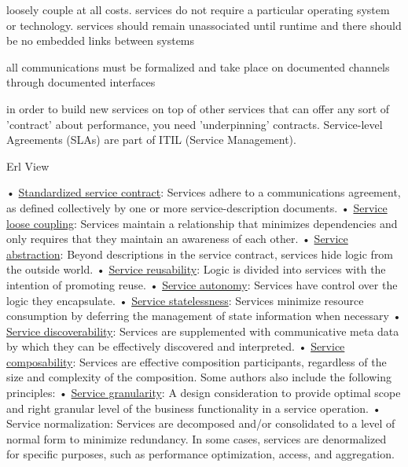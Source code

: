 \documentclass{article}
\begin{document}
loosely couple at all costs. services do not require a particular operating system or technology.  services should remain unassociated until runtime and there should be no embedded links between systems

all communications must be formalized and take place on documented channels through documented interfaces

in order to build new services on top of other services that can offer any sort of 'contract' about performance, you need 'underpinning' contracts.  Service-level Agreements (SLAs) are part of ITIL (Service Management).

Erl View

	•	
\href{http://en.wikipedia.org/wiki/Service-oriented\_architecture#Service\_contract}{Standardized service contract}: Services adhere to a communications agreement, as defined collectively by one or more service-description documents.
	•	
\href{http://en.wikipedia.org/wiki/Service\_loose\_coupling}{Service loose coupling}: Services maintain a relationship that minimizes dependencies and only requires that they maintain an awareness of each other.
	•	
\href{http://en.wikipedia.org/wiki/Service\_abstraction}{Service abstraction}: Beyond descriptions in the service contract, services hide logic from the outside world.
	•	
\href{http://en.wikipedia.org/wiki/Service\_Reusability\_Principle}{Service reusability}: Logic is divided into services with the intention of promoting reuse.
	•	
\href{http://en.wikipedia.org/wiki/Service\_Autonomy\_Principle}{Service autonomy}: Services have control over the logic they encapsulate.
	•	
\href{http://en.wikipedia.org/wiki/Service\_Statelessness\_Principle}{Service statelessness}: Services minimize resource consumption by deferring the management of state information when necessary
	•	
\href{http://en.wikipedia.org/wiki/Service\_discovery}{Service discoverability}: Services are supplemented with communicative meta data by which they can be effectively discovered and interpreted.
	•	
\href{http://en.wikipedia.org/wiki/Service\_Composability\_Principle}{Service composability}: Services are effective composition participants, regardless of the size and complexity of the composition.
Some authors also include the following principles:
	•	
\href{http://en.wikipedia.org/wiki/Service\_Granularity\_Principle}{Service granularity}: A design consideration to provide optimal scope and right granular level of the business functionality in a service operation.
	•	Service normalization: Services are decomposed and/or consolidated to a level of normal form to minimize redundancy. In some cases, services are denormalized for specific purposes, such as performance optimization, access, and aggregation.
\end{document}
